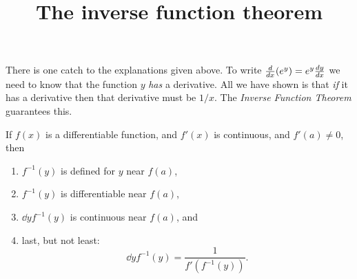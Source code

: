 \documentclass{ximera}
\title[Dig-In:]{The inverse function theorem}
\begin{document}
\begin{abstract}
\end{abstract}
\maketitle

There is one catch to the explanations given above. To write
$\ddx(e^y)=e^y\dd[y]{x}$ we need to know that the function $y$
\textit{has} a derivative. All we have shown is that \textit{if} it
has a derivative then that derivative must be $1/x$. The
\textit{Inverse Function Theorem} guarantees this.

\begin{theorem}\label{theorem:IFT}
If $f(x)$ is a differentiable function, and $f'(x)$ is continuous, and
$f'(a) \neq 0$, then
\begin{enumerate}
\item $f^{-1}(y)$ is defined for $y$ near $f(a)$,
\item $f^{-1}(y)$ is differentiable near $f(a)$, 
\item $\dd{y} f^{-1}(y)$ is continuous near $f(a)$, and
\item last, but not least:
  \[
  \dd{y} f^{-1}(y)  = \frac{1}{f'(f^{-1}(y))}.
  \]
\end{enumerate}
\end{theorem}
\end{document}

